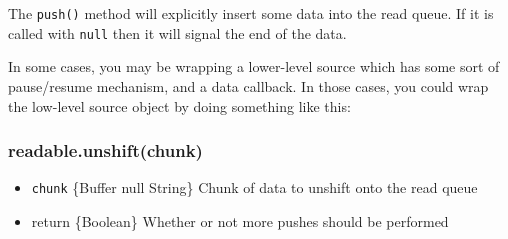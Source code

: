 The \texttt{push()} method will explicitly insert some data into the
read queue. If it is called with \texttt{null} then it will signal the
end of the data.

In some cases, you may be wrapping a lower-level source which has some
sort of pause/resume mechanism, and a data callback. In those cases, you
could wrap the low-level source object by doing something like this:

\begin{Shaded}
\begin{Highlighting}[]

  

 \NormalTok{= }
   \NormalTok{(!}
    \NormalTok{();}
\NormalTok{\};}

 \NormalTok{= }\NormalTok{() \{}
\NormalTok{\};}

 \NormalTok{= }
  \NormalTok{();}
\NormalTok{\};}
\end{Highlighting}
\end{Shaded}

\subsubsection{readable.unshift(chunk)}

\begin{itemize}
\item
  \texttt{chunk} \{Buffer \textbar{} null \textbar{} String\} Chunk of
  data to unshift onto the read queue
\item
  return \{Boolean\} Whether or not more pushes should be performed
\end{itemize}

